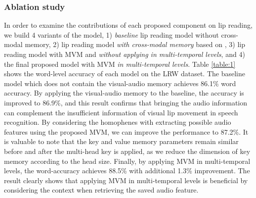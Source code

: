 \documentclass[letterpaper]{article} \usepackage{aaai22}  \usepackage{times}  \usepackage{helvet}  \usepackage{courier}  \usepackage[hyphens]{url}  \usepackage{graphicx} \urlstyle{rm} \def\UrlFont{\rm}  \usepackage{natbib}  \usepackage{caption} \DeclareCaptionStyle{ruled}{labelfont=normalfont,labelsep=colon,strut=off} \frenchspacing  \setlength{\pdfpagewidth}{8.5in}  \setlength{\pdfpageheight}{11in}  \usepackage{algorithm}
\begin{document}
\subsubsection{Ablation study}
In order to examine the contributions of each proposed component on lip reading, we build 4 variants of the model, 1) \textit{baseline} lip reading model without cross-modal memory, 2) lip reading model \textit{with cross-modal memory} based on \cite{kim2021visualaudiomem}, 3) lip reading model with MVM and \textit{without applying in multi-temporal levels}, and 4) the final proposed model with MVM \textit{in multi-temporal levels}. Table \ref{table:1} shows the word-level accuracy of each model on the LRW dataset. The baseline model which does not contain the visual-audio memory achieves 86.1\% word accuracy. By applying the visual-audio memory to the baseline, the accuracy is improved to 86.9\%, and this result confirms that bringing the audio information can complement the insufficient information of visual lip movement in speech recognition. By considering the homophenes with extracting possible audio features using the proposed MVM, we can improve the performance to 87.2\%. It is valuable to note that the key and value memory parameters remain similar before and after the multi-head key is applied, as we reduce the dimension of key memory according to the head size. Finally, by applying MVM in multi-temporal levels, the word-accuracy achieves 88.5\% with additional 1.3\% improvement. The result clearly shows that applying MVM in multi-temporal levels is beneficial by considering the context when retrieving the saved audio feature.

\begin{table}[]
	\renewcommand{\arraystretch}{1.2}
	\renewcommand{\tabcolsep}{7mm}
\centering
{}
\caption{Effect of different hyperparameters of MVM.}
\label{table:2}
\end{table}
\end{document}
